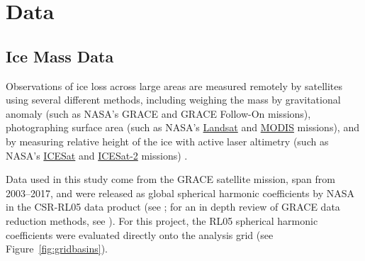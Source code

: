 \documentclass[11pt]{report}
\begin{document}







%



\section{Data \label{sec:data}}

\subsection{Ice Mass Data}

Observations of ice loss across large areas are measured remotely by satellites using several different methods, including weighing the mass by gravitational anomaly (such as NASA's GRACE and GRACE Follow-On missions), photographing surface area (such as NASA's \href{https://landsat.gsfc.nasa.gov}{Landsat} and \href{https://terra.nasa.gov/about/terra-instruments/modis}{MODIS} missions), and by measuring relative height of the ice with active laser altimetry (such as NASA's \href{https://icesat.gsfc.nasa.gov/icesat/}{ICESat} and \href{https://icesat-2.gsfc.nasa.gov}{ICESat-2} missions) \cite[][]{khan2015}.

Data used in this study come from the GRACE satellite mission, span from 2003--2017, and were released as global spherical harmonic coefficients by NASA in the CSR-RL05 data product (see ; for an in depth review of GRACE data reduction methods, see ). For this project, the RL05 spherical harmonic coefficients were evaluated directly onto the analysis grid (see Figure~\ref{fig:gridbasins}).
 
\end{document}
